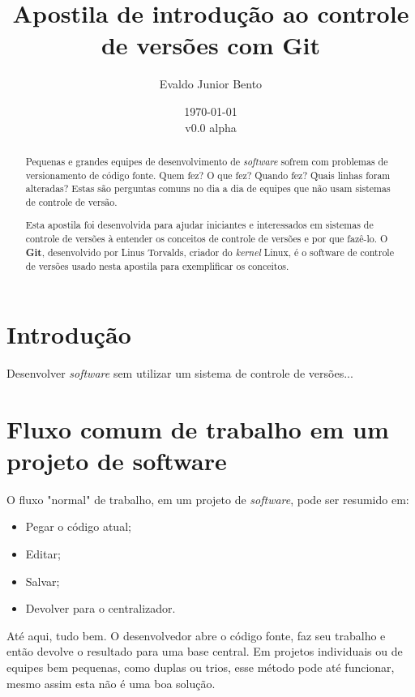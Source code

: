 \documentclass[12pt,a4paper]{report}
\begin{document}
\title{Apostila de introdução ao controle de versões com Git}
\author{Evaldo Junior Bento}
\date{\today\\v0.0 alpha}

\maketitle

\begin{abstract}
Pequenas e grandes equipes de desenvolvimento de \textit{software} sofrem
com problemas de versionamento de código fonte. Quem fez? O que fez? Quando
fez? Quais linhas foram alteradas? Estas são perguntas comuns no dia a dia de
equipes que não usam sistemas de controle de versão.

Esta apostila foi desenvolvida para ajudar iniciantes e interessados em
sistemas de controle de versões à entender os conceitos de controle de versões
e por que fazê-lo. O \textbf{Git}, desenvolvido por Linus Torvalds, criador do
\textit{kernel} Linux, é o software de controle de versões usado nesta
apostila para exemplificar os conceitos.
\end{abstract}

\tableofcontents

\chapter{Introdução}
    Desenvolver \textit{software} sem utilizar um sistema de controle de versões...

\chapter{Fluxo comum de trabalho em um projeto de software}
    O fluxo "normal" de trabalho, em um projeto de \textit{software}, pode ser
    resumido em:
    \begin{itemize}
        \item Pegar o código atual;
        \item Editar;
        \item Salvar;
        \item Devolver para o centralizador.
    \end{itemize}
    Até aqui, tudo bem. O desenvolvedor abre o código fonte, faz seu trabalho e
    então devolve o resultado para uma base central. Em projetos individuais ou
    de equipes bem pequenas, como duplas ou trios, esse método pode até
    funcionar, mesmo assim esta não é uma boa solução.
    
\end{document}
